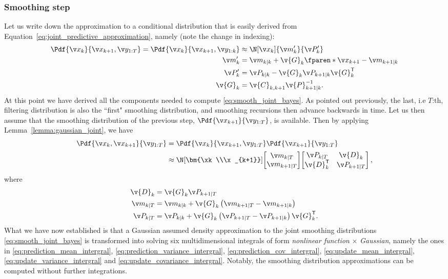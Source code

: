 \subsubsection*{Smoothing step}

Let us write down the approximation to a 
conditional distribution that is easily derived from Equation~\eqref{eq:joint_predictive_approximation}, 
namely (note the change in indexing):
\begin{align}
	\Pdf{\xk}{\x_{k+1},\y_{1:T}}=\Pdf{\xk}{\x_{k+1},\y_{1:k}}&\approx \N[\xk]{\m'_{k}}{\P'_{k}}\\
	\m'_{k} &= \m_{k|k}+\v{G}_k\fparen*{\x_{k+1}-\m_{k+1|k}}\\
	\P'_{k} &= \P_{k|k}-\v{G}_k\P_{k+1|k}\v{G}_k^\tr\\
	\v{G}_k &= \v{C}_{k,k+1}\v{P}_{k+1|k}^{-1}.
	\label{eq:middle_conditional}
\end{align}
At this point we have derived all the components needed to compute
\eqref{eq:smooth_joint_bayes}. As pointed out previously, the last, i.e $T$:th, filtering 
distribution is also the ``first" smoothing distribution, and smoothing recursions
then advance backwards in time. Let us then assume that the smoothing
distribution of the previous step, $\Pdf{\x_{k+1}}{\y_{1:T}}$, is available. Then
by applying Lemma~\ref{lemma:gaussian_joint}, we have
\begin{align}
	\Pdf{\xk,\x_{k+1}}{\Y}&=\Pdf{\xk}{\x_{k+1},\y_{1:T}}\Pdf{\x_{k+1}}{\y_{1:T}}\\
	&\approx
	\N[\bm{\xk\\\x_{k+1}}]{
	\begin{bmatrix}
		\m_{k|T}\\
		\m_{k+1|T}
	\end{bmatrix}}{
	\begin{bmatrix}
		\P_{k|T}&\v{D}_{k}\\
		\v{D}_{k}^\tr&\P_{k+1|T}
	\end{bmatrix},
	}\label{eq:joint_smoothing}
\end{align}
where
\begin{align}
	\v{D}_{k}&=\v{G}_{k}\P_{k+1|T}\\
	\m_{k|T}&=\m_{k|k}+\v{G}_{k}\left(\m_{k+1|T}-\m_{k+1|k}\right)\\
	\P_{k|T}&=\P_{k|k}+\v{G}_{k}\left(\P_{k+1|T}-\P_{k+1|k}\right)\v{G}_{k}^\tr.
\end{align}%
%
What we have now established is that a Gaussian assumed density approximation to the joint 
smoothing distributions \eqref{eq:smooth_joint_bayes} is transformed into solving six
multidimensional integrals of form \emph{nonlinear function} $\times$ \emph{Gaussian}, 
namely the ones in
\eqref{eq:prediction_mean_intergral}, \eqref{eq:prediction_variance_intergral}, \eqref{eq:prediction_cov_intergral},
\eqref{eq:update_mean_intergral}, \eqref{eq:update_variance_intergral} and
\eqref{eq:update_covariance_intergral}. 
Notably, the smoothing distribution approximations can be computed
without further integrations.


